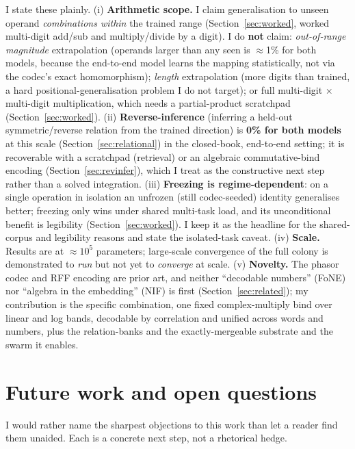 \documentclass[11pt]{article}
\begin{document}
I state these plainly. (i) \textbf{Arithmetic scope.} I claim generalisation to unseen operand
\emph{combinations within} the trained range (Section~\ref{sec:worked}, worked multi-digit add/sub and
multiply/divide by a digit). I do \textbf{not} claim: \emph{out-of-range magnitude} extrapolation
(operands larger than any seen is $\approx$1\% for both models, because the end-to-end model learns the
mapping statistically, not via the codec's exact homomorphism); \emph{length} extrapolation (more
digits than trained, a hard positional-generalisation problem I do not target); or full multi-digit
$\times$ multi-digit multiplication, which needs a partial-product scratchpad
(Section~\ref{sec:worked}). (ii) \textbf{Reverse-inference} (inferring a held-out symmetric/reverse
relation from the trained direction) is \textbf{0\% for both models} at this scale
(Section~\ref{sec:relational}) in the closed-book, end-to-end setting; it is recoverable with a scratchpad
(retrieval) or an algebraic commutative-bind encoding (Section~\ref{sec:revinfer}), which I treat as the
constructive next step rather than a solved integration. (iii) \textbf{Freezing is regime-dependent}: on a single operation in
isolation an unfrozen (still codec-seeded) identity generalises better; freezing only wins under shared
multi-task load, and its unconditional benefit is legibility (Section~\ref{sec:worked}). I keep it as
the headline for the shared-corpus and legibility reasons and state the isolated-task caveat. (iv)
\textbf{Scale.} Results are at $\approx 10^5$ parameters; large-scale convergence of the full colony is
demonstrated to \emph{run} but not yet to \emph{converge} at scale. (v) \textbf{Novelty.} The phasor codec and RFF
encoding are prior art, and neither ``decodable numbers'' (FoNE) nor ``algebra in the embedding'' (NIF)
is first (Section~\ref{sec:related}); my contribution is the specific combination, one fixed
complex-multiply bind over linear and log bands, decodable by correlation and unified across words and
numbers, plus the relation-banks and the exactly-mergeable substrate and the swarm it enables.

\section{Future work and open questions}

I would rather name the sharpest objections to this work than let a reader find them unaided. Each is a
concrete next step, not a rhetorical hedge.
\end{document}
